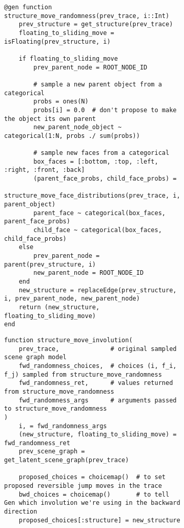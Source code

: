 \begin{figure}[H]
\begin{subfigure}{\textwidth}
\begin{lstlisting}
@gen function structure_move_randomness(prev_trace, i::Int)
    prev_structure = get_structure(prev_trace)
    floating_to_sliding_move = isFloating(prev_structure, i)

    if floating_to_sliding_move
        prev_parent_node = ROOT_NODE_ID

        # sample a new parent object from a categorical
        probs = ones(N)
        probs[i] = 0.0  # don't propose to make the object its own parent
        new_parent_node_object ~ categorical(1:N, probs ./ sum(probs))

        # sample new faces from a categorical
        box_faces = [:bottom, :top, :left, :right, :front, :back]
        (parent_face_probs, child_face_probs) =
            structure_move_face_distributions(prev_trace, i, parent_object)
        parent_face ~ categorical(box_faces, parent_face_probs)
        child_face ~ categorical(box_faces, child_face_probs)
    else
        prev_parent_node = parent(prev_structure, i)
        new_parent_node = ROOT_NODE_ID
    end
    new_structure = replaceEdge(prev_structure, i, prev_parent_node, new_parent_node)
    return (new_structure, floating_to_sliding_move)
end
\end{lstlisting}
\end{subfigure}

\begin{subfigure}{\textwidth}
\centering
\begin{lstlisting}
function structure_move_involution(
    prev_trace,              # original sampled scene graph model
    fwd_randomness_choices,  # choices (i, f_i, f_j) sampled from structure_move_randomness
    fwd_randomness_ret,      # values returned from structure_move_randomness
    fwd_randomness_args      # arguments passed to structure_move_randomness
)
    i, = fwd_randomness_args
    (new_structure, floating_to_sliding_move) = fwd_randomness_ret
    prev_scene_graph = get_latent_scene_graph(prev_trace)

    proposed_choices = choicemap()  # to set proposed reversible jump moves in the trace
    bwd_choices = choicemap()       # to tell Gen which involution we're using in the backward direction
    proposed_choices[:structure] = new_structure


\end{lstlisting}
\end{subfigure}
\end{figure}
